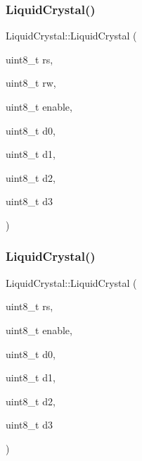 \mbox{\label{class_liquid_crystal_a0a0a8dfa7a2e775a031fd65f5c6366ec}} 
\subsubsection{\texorpdfstring{Liquid\+Crystal()}{LiquidCrystal()}\hspace{0.1cm}{\footnotesize\ttfamily [3/4]}}
{\footnotesize\ttfamily Liquid\+Crystal\+::\+Liquid\+Crystal (\begin{DoxyParamCaption}\item[{uint8\+\_\+t}]{rs,  }\item[{uint8\+\_\+t}]{rw,  }\item[{uint8\+\_\+t}]{enable,  }\item[{uint8\+\_\+t}]{d0,  }\item[{uint8\+\_\+t}]{d1,  }\item[{uint8\+\_\+t}]{d2,  }\item[{uint8\+\_\+t}]{d3 }\end{DoxyParamCaption})}

\mbox{\label{class_liquid_crystal_a23124e6dd5ac4a9b6147629b96e91953}} 
\subsubsection{\texorpdfstring{Liquid\+Crystal()}{LiquidCrystal()}\hspace{0.1cm}{\footnotesize\ttfamily [4/4]}}
{\footnotesize\ttfamily Liquid\+Crystal\+::\+Liquid\+Crystal (\begin{DoxyParamCaption}\item[{uint8\+\_\+t}]{rs,  }\item[{uint8\+\_\+t}]{enable,  }\item[{uint8\+\_\+t}]{d0,  }\item[{uint8\+\_\+t}]{d1,  }\item[{uint8\+\_\+t}]{d2,  }\item[{uint8\+\_\+t}]{d3 }\end{DoxyParamCaption})}



